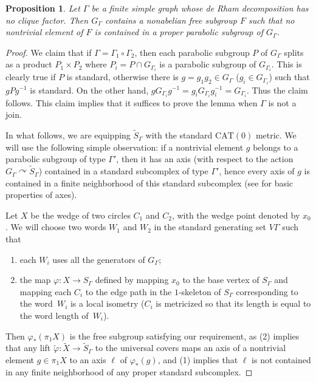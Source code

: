 \documentclass[JEP,XML,SOM,Unicode,NoFloatCountersInSection,published]{cedram}
\theoremstyle{plain}
\newtheorem{prop}[theo]{Proposition}
\theoremstyle{definition}
\let\actson\curvearrowright
\begin{document}
\begin{prop}\label{prop:kim-koberda}
Let $\Gamma$ be a finite simple graph whose de Rham decomposition has no clique factor. Then $G_\Gamma$ contains a nonabelian free subgroup $F$ such that no nontrivial element of $F$ is contained in a proper parabolic subgroup of $G_\Gamma$.
\end{prop}
\begin{proof}
We claim that if $\Gamma=\Gamma_1\circ\Gamma_2$, then each parabolic subgroup $P$ of $G_\Gamma$ splits as a product $P_1\times P_2$ where $P_i=P\cap G_{\Gamma_i}$ is a parabolic subgroup of $G_{\Gamma_i}$. This is clearly true if $P$ is standard, otherwise there is $g=g_1g_2\in G_{\Gamma}$ ($g_i\in G_{\Gamma_i}$) such that $gPg^{-1}$ is standard. On the other hand, $gG_{\Gamma_i}g^{-1}=g_i G_{\Gamma_i} g^{-1}_i=G_{\Gamma_i}$. Thus the claim follows. This claim implies that it suffices to prove the lemma when $\Gamma$ is not a join.

In what follows, we are equipping $\widetilde{S}_\Gamma$ with the standard $\mathrm{CAT}(0)$ metric.
We will use the following simple observation: if a nontrivial element $g$ belongs to a parabolic subgroup of type $\Gamma'$, then it has an axis (with respect to the action $G_\Gamma\actson \widetilde{S}_\Gamma$) contained in a standard subcomplex of type $\Gamma'$, hence every axis of $g$ is contained in a finite neighborhood of this standard subcomplex (see \cite[Chap.\,II.6]{bridson2013metric} for basic properties of axes).


Let $X$ be the wedge of two circles $C_1$ and $C_2$, with the wedge point denoted by $x_0$. We will choose two words $W_1$ and $W_2$ in the standard generating set $V\Gamma$ such that
\begin{enumerate}
\item[(1)] each $W_i$ uses all the generators of $G_\Gamma$;
\item[(2)] the map $\varphi:X\to S_\Gamma$ defined by mapping $x_0$ to the base vertex of $S_\Gamma$ and mapping each $C_i$ to the edge path in the $1$-skeleton of $S_\Gamma$ corresponding to the word~$W_i$ is a local isometry ($C_i$ is metricized so that its length is equal to the word length of~$W_i$).
\end{enumerate}
Then $\varphi_\ast(\pi_1 X)$ is the free subgroup satisfying our requirement, as (2) implies that any lift $\tilde \varphi:\widetilde X\to \widetilde{S}_\Gamma$ to the universal covers maps an axis of a nontrivial element $g\in \pi_1 X$ to an axis $\ell$ of $\varphi_\ast(g)$, and (1) implies that $\ell$ is not contained in any finite neighborhood of any proper standard subcomplex.


\end{proof}
\end{document}
